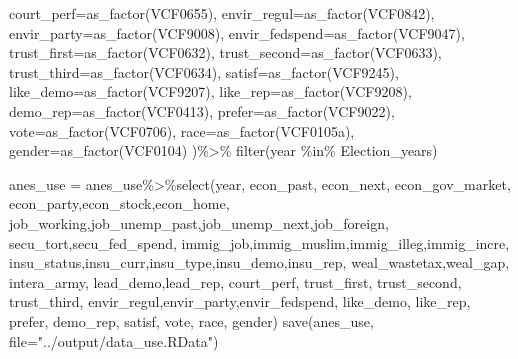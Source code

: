 \documentclass[
]{article}
\newenvironment{Shaded}{\begin{snugshade}}{\end{snugshade}}
\newcommand{\AttributeTok}[1]{\textcolor[rgb]{0.77,0.63,0.00}{#1}}
\newcommand{\FunctionTok}[1]{\textcolor[rgb]{0.00,0.00,0.00}{#1}}
\newcommand{\NormalTok}[1]{#1}
\newcommand{\OtherTok}[1]{\textcolor[rgb]{0.56,0.35,0.01}{#1}}
\newcommand{\SpecialCharTok}[1]{\textcolor[rgb]{0.00,0.00,0.00}{#1}}
\newcommand{\StringTok}[1]{\textcolor[rgb]{0.31,0.60,0.02}{#1}}
\begin{document}
\begin{Shaded}
\begin{Highlighting}[]
    \AttributeTok{court\_perf=}\FunctionTok{as\_factor}\NormalTok{(VCF0655),}
    \AttributeTok{envir\_regul=}\FunctionTok{as\_factor}\NormalTok{(VCF0842),}
    \AttributeTok{envir\_party=}\FunctionTok{as\_factor}\NormalTok{(VCF9008),}
    \AttributeTok{envir\_fedspend=}\FunctionTok{as\_factor}\NormalTok{(VCF9047),}
    \AttributeTok{trust\_first=}\FunctionTok{as\_factor}\NormalTok{(VCF0632),}
    \AttributeTok{trust\_second=}\FunctionTok{as\_factor}\NormalTok{(VCF0633),}
    \AttributeTok{trust\_third=}\FunctionTok{as\_factor}\NormalTok{(VCF0634),}
    \AttributeTok{satisf=}\FunctionTok{as\_factor}\NormalTok{(VCF9245),}
    \AttributeTok{like\_demo=}\FunctionTok{as\_factor}\NormalTok{(VCF9207),}
    \AttributeTok{like\_rep=}\FunctionTok{as\_factor}\NormalTok{(VCF9208),}
    \AttributeTok{demo\_rep=}\FunctionTok{as\_factor}\NormalTok{(VCF0413),}
    \AttributeTok{prefer=}\FunctionTok{as\_factor}\NormalTok{(VCF9022),}
    \AttributeTok{vote=}\FunctionTok{as\_factor}\NormalTok{(VCF0706),}
    \AttributeTok{race=}\FunctionTok{as\_factor}\NormalTok{(VCF0105a),}
    \AttributeTok{gender=}\FunctionTok{as\_factor}\NormalTok{(VCF0104)}
\NormalTok{  )}\SpecialCharTok{\%\textgreater{}\%}
  \FunctionTok{filter}\NormalTok{(year }\SpecialCharTok{\%in\%}\NormalTok{ Election\_years)}

\NormalTok{anes\_use }\OtherTok{=}\NormalTok{ anes\_use}\SpecialCharTok{\%\textgreater{}\%}\FunctionTok{select}\NormalTok{(year, }
\NormalTok{                             econ\_past, econ\_next, econ\_gov\_market, econ\_party,econ\_stock,econ\_home,}
\NormalTok{                            job\_working,job\_unemp\_past,job\_unemp\_next,job\_foreign,}
\NormalTok{                            secu\_tort,secu\_fed\_spend,}
\NormalTok{                            immig\_job,immig\_muslim,immig\_illeg,immig\_incre,}
\NormalTok{                            insu\_status,insu\_curr,insu\_type,insu\_demo,insu\_rep,}
\NormalTok{                            weal\_wastetax,weal\_gap,}
\NormalTok{                            intera\_army,}
\NormalTok{                            lead\_demo,lead\_rep,}
\NormalTok{                            court\_perf,}
\NormalTok{                            trust\_first, trust\_second, trust\_third,}
\NormalTok{                            envir\_regul,envir\_party,envir\_fedspend,}
\NormalTok{                            like\_demo, like\_rep,}
\NormalTok{                            prefer,}
\NormalTok{                            demo\_rep,}
\NormalTok{                            satisf,}
\NormalTok{                            vote, race, gender)}
\FunctionTok{save}\NormalTok{(anes\_use, }\AttributeTok{file=}\StringTok{"../output/data\_use.RData"}\NormalTok{)}
\end{Highlighting}
\end{Shaded}
\end{document}
